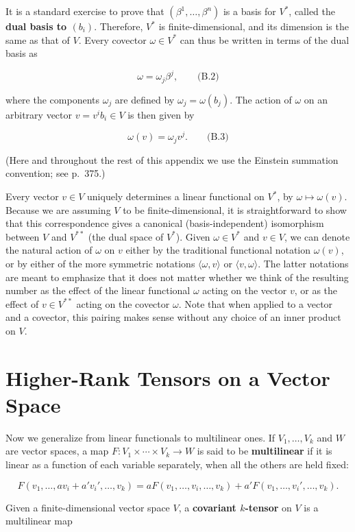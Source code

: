 It is a standard exercise to prove that $(\beta^1,\ldots,\beta^n)$ is a basis for $V^*$, called the \textbf{dual basis to $(b_i)$}. Therefore, $V^*$ is finite-dimensional, and its dimension is the same as that of $V$. Every covector $\omega \in V^*$ can thus be written in terms of the dual basis as

\[
\omega = \omega_j \beta^j, \qquad \text{(B.2)}
\]

where the components $\omega_j$ are defined by $\omega_j = \omega(b_j)$. The action of $\omega$ on an arbitrary vector $v = v^i b_i \in V$ is then given by

\[
\omega(v) = \omega_j v^j. \qquad \text{(B.3)}
\]

(Here and throughout the rest of this appendix we use the Einstein summation convention; see p.~375.)

Every vector $v \in V$ uniquely determines a linear functional on $V^*$, by $\omega \mapsto \omega(v)$. Because we are assuming $V$ to be finite-dimensional, it is straightforward to show that this correspondence gives a canonical (basis-independent) isomorphism between $V$ and $V^{**}$ (the dual space of $V^*$). Given $\omega \in V^*$ and $v \in V$, we can denote the natural action of $\omega$ on $v$ either by the traditional functional notation $\omega(v)$, or by either of the more symmetric notations $\langle\omega, v\rangle$ or $\langle v, \omega\rangle$. The latter notations are meant to emphasize that it does not matter whether we think of the resulting number as the effect of the linear functional $\omega$ acting on the vector $v$, or as the effect of $v \in V^{**}$ acting on the covector $\omega$. Note that when applied to a vector and a covector, this pairing makes sense without any choice of an inner product on $V$.

\section{Higher-Rank Tensors on a Vector Space}

Now we generalize from linear functionals to multilinear ones. If $V_1,\ldots,V_k$ and $W$ are vector spaces, a map $F: V_1 \times \cdots \times V_k \to W$ is said to be \textbf{multilinear} if it is linear as a function of each variable separately, when all the others are held fixed:

\[
F(v_1,\ldots,av_i + a'v_i',\ldots,v_k) = aF(v_1,\ldots,v_i,\ldots,v_k) + a'F(v_1,\ldots,v_i',\ldots,v_k).
\]

Given a finite-dimensional vector space $V$, a \textbf{covariant $k$-tensor} on $V$ is a multilinear map

